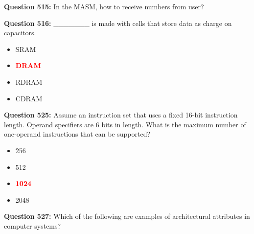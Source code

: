 \documentclass[12pt,a4paper]{article}
\begin{document}
\textbf{Question 515:} In the MASM, how to receive numbers from user?


\vspace{0.5cm}

\textbf{Question 516:} _______ is made with cells that store data as charge on capacitors.

\begin{itemize}
    \item[\textbf{A.}] SRAM
    \item[\textbf{B.}] \textcolor{red}{\textbf{DRAM}}
    \item[\textbf{C.}] RDRAM
    \item[\textbf{D.}] CDRAM
\end{itemize}

\vspace{0.5cm}

\textbf{Question 525:} Assume an instruction set that uses a fixed 16-bit instruction length. Operand specifiers are 6 bits in length. What is the maximum number of one-operand instructions that can be supported?

\begin{itemize}
    \item[\textbf{A.}] 256
    \item[\textbf{B.}] 512
    \item[\textbf{C.}] \textcolor{red}{\textbf{1024}}
    \item[\textbf{D.}] 2048
\end{itemize}

\vspace{0.5cm}

\textbf{Question 527:} Which of the following are examples of architectural attributes in computer systems?
\end{document}
